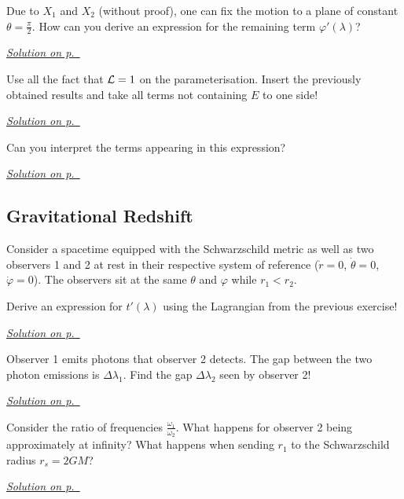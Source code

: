 \begin{exercise}\label{ex:schwarzschild-6}
Due to $X_1$ and $X_2$ (without proof), one can fix the motion to a plane of constant $\theta=\frac{\pi}{2}$. How can you derive an expression for the remaining term $\varphi'(\lambda)$?
\end{exercise}
\hyperref[sol:schwarzschild-6]{\small \textit{Solution on p.~\pageref*{sol:schwarzschild-6}}}

\begin{exercise}\label{ex:schwarzschild-7}
Use all the fact that $\mathcal{L}=1$ on the parameterisation. Insert the previously obtained results and take all terms not containing $E$ to one side!
\end{exercise}
\hyperref[sol:schwarzschild-7]{\small \textit{Solution on p.~\pageref*{sol:schwarzschild-7}}}

\begin{exercise}\label{ex:schwarzschild-8}
Can you interpret the terms appearing in this expression?
\end{exercise}
\hyperref[sol:schwarzschild-8]{\small \textit{Solution on p.~\pageref*{sol:schwarzschild-8}}}

\subsection{Gravitational Redshift}

\begin{exercise}\label{ex:schwarzschild-9}
Consider a spacetime equipped with the Schwarzschild metric as well as two observers 1 and 2 at rest in their respective system of reference ($\dot{r}=0$, $\dot{\theta}=0$, $\dot{\varphi}=0$). The observers sit at the same $\theta$ and $\varphi$ while $r_1<r_2$.

Derive an expression for $t'(\lambda)$ using the Lagrangian from the previous exercise!
\end{exercise}
\hyperref[sol:schwarzschild-9]{\small \textit{Solution on p.~\pageref*{sol:schwarzschild-9}}}

\begin{exercise}\label{ex:schwarzschild-10}
Observer 1 emits photons that observer 2 detects. The gap between the two photon emissions is $\Delta \lambda_1$. Find the gap $\Delta \lambda_2$ seen by observer 2!
\end{exercise}
\hyperref[sol:schwarzschild-10]{\small \textit{Solution on p.~\pageref*{sol:schwarzschild-10}}}

\begin{exercise}\label{ex:schwarzschild-11}
Consider the ratio of frequencies $\frac{\omega_1}{\omega_2}$. What happens for observer 2 being approximately at infinity? What happens when sending $r_1$ to the Schwarzschild radius $r_s=2GM$?
\end{exercise}
\hyperref[sol:schwarzschild-11]{\small \textit{Solution on p.~\pageref*{sol:schwarzschild-11}}}
